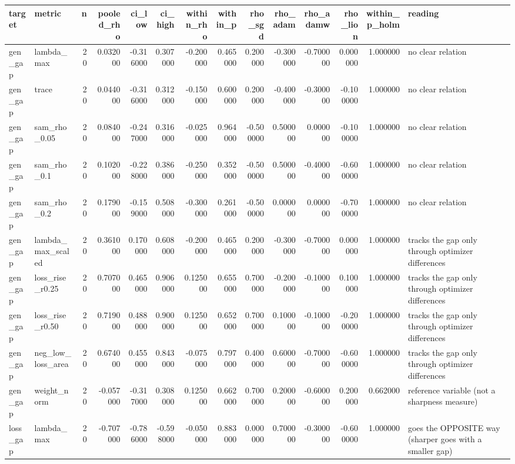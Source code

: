 \begin{tabular}{llrrrrrrrrrrrl}
\toprule
target & metric & n & pooled\_rho & ci\_low & ci\_high & within\_rho & within\_p & rho\_sgd & rho\_adam & rho\_adamw & rho\_lion & within\_p\_holm & reading \\
\midrule
gen\_gap & lambda\_max & 20 & 0.032000 & -0.316000 & 0.307000 & -0.200000 & 0.465000 & 0.200000 & -0.300000 & -0.700000 & 0.000000 & 1.000000 & no clear relation \\
gen\_gap & trace & 20 & 0.044000 & -0.316000 & 0.312000 & -0.150000 & 0.600000 & 0.200000 & -0.400000 & -0.300000 & -0.100000 & 1.000000 & no clear relation \\
gen\_gap & sam\_rho\_0.05 & 20 & 0.084000 & -0.247000 & 0.316000 & -0.025000 & 0.964000 & -0.500000 & 0.500000 & 0.000000 & -0.100000 & 1.000000 & no clear relation \\
gen\_gap & sam\_rho\_0.1 & 20 & 0.102000 & -0.228000 & 0.386000 & -0.250000 & 0.352000 & -0.500000 & 0.500000 & -0.400000 & -0.600000 & 1.000000 & no clear relation \\
gen\_gap & sam\_rho\_0.2 & 20 & 0.179000 & -0.159000 & 0.508000 & -0.300000 & 0.261000 & -0.500000 & 0.000000 & 0.000000 & -0.700000 & 1.000000 & no clear relation \\
gen\_gap & lambda\_max\_scaled & 20 & 0.361000 & 0.170000 & 0.608000 & -0.200000 & 0.465000 & 0.200000 & -0.300000 & -0.700000 & 0.000000 & 1.000000 & tracks the gap only through optimizer differences \\
gen\_gap & loss\_rise\_r0.25 & 20 & 0.707000 & 0.465000 & 0.906000 & 0.125000 & 0.655000 & 0.700000 & -0.200000 & -0.100000 & 0.100000 & 1.000000 & tracks the gap only through optimizer differences \\
gen\_gap & loss\_rise\_r0.50 & 20 & 0.719000 & 0.488000 & 0.900000 & 0.125000 & 0.652000 & 0.700000 & 0.100000 & -0.100000 & -0.200000 & 1.000000 & tracks the gap only through optimizer differences \\
gen\_gap & neg\_low\_loss\_area & 20 & 0.674000 & 0.455000 & 0.843000 & -0.075000 & 0.797000 & 0.400000 & 0.600000 & -0.700000 & -0.600000 & 1.000000 & tracks the gap only through optimizer differences \\
gen\_gap & weight\_norm & 20 & -0.057000 & -0.317000 & 0.308000 & 0.125000 & 0.662000 & 0.700000 & 0.200000 & -0.600000 & 0.200000 & 0.662000 & reference variable (not a sharpness measure) \\
loss\_gap & lambda\_max & 20 & -0.707000 & -0.786000 & -0.598000 & -0.050000 & 0.883000 & 0.000000 & 0.700000 & -0.300000 & -0.600000 & 1.000000 & goes the OPPOSITE way (sharper goes with a smaller gap) \\

\end{tabular}
